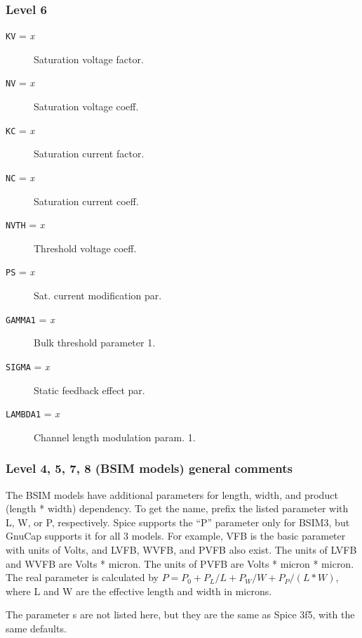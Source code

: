 \subsubsection{Level 6}
\begin{description}

\item[{\tt KV} = {\it x}] Saturation voltage factor.

\item[{\tt NV} = {\it x}] Saturation voltage coeff.

\item[{\tt KC} = {\it x}] Saturation current factor.

\item[{\tt NC} = {\it x}] Saturation current coeff.

\item[{\tt NVTH} = {\it x}] Threshold voltage coeff.

\item[{\tt PS} = {\it x}] Sat. current modification  par.

\item[{\tt GAMMA1} = {\it x}] Bulk threshold parameter 1.

\item[{\tt SIGMA} = {\it x}] Static feedback effect par.

\item[{\tt LAMBDA1} = {\it x}] Channel length modulation param. 1.

\end{description}
\subsubsection{Level 4, 5, 7, 8 (BSIM models) general comments}

The BSIM models have additional parameters for length, width, and
product (length * width) dependency.  To get the name, prefix the
listed parameter with L, W, or P, respectively.  Spice supports the
``P'' parameter only for BSIM3, but GnuCap supports it for all 3 models.
For example, VFB is the basic parameter with units of Volts, and LVFB,
WVFB, and PVFB also exist.  The units of LVFB and WVFB are Volts *
micron.  The units of PVFB are Volts * micron * micron.  The real
parameter is calculated by $P = P_0 + P_L / L + P_W / W + P_P / (L*W)$,
where L and W are the effective length and width in microns.

The parameter s are not listed here, but they are the same as Spice
3f5, with the same defaults.

